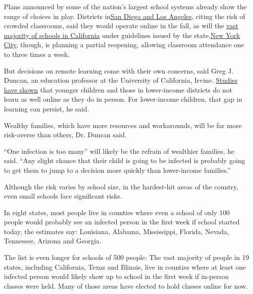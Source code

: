 Plans announced by some of the nation's largest school systems already
show the range of choices in play. Districts
in\href{https://www.nytimes3xbfgragh.onion/2020/07/13/us/lausd-san-diego-school-reopening.html}{}\href{https://www.nytimes3xbfgragh.onion/2020/07/13/us/lausd-san-diego-school-reopening.html}{San
Diego and Los Angeles}, citing the risk of crowded classrooms, said they
would operate online in the fall, as will the
\href{https://www.nytimes3xbfgragh.onion/2020/07/17/us/california-schools-reopening-newsom.html}{vast
majority of schools in California} under guidelines issued by the
state.\href{https://www.nytimes3xbfgragh.onion/2020/07/08/nyregion/nyc-schools-reopening-plan.html}{}\href{https://www.nytimes3xbfgragh.onion/2020/07/08/nyregion/nyc-schools-reopening-plan.html}{New
York City}, though, is planning a partial reopening, allowing classroom
attendance one to three times a week.

But decisions on remote learning come with their own concerns, said Greg
J. Duncan, an education professor at the University of California,
Irvine.
\href{https://www.nytimes3xbfgragh.onion/2020/06/05/us/coronavirus-education-lost-learning.html}{Studies
have shown} that younger children and those in lower-income districts do
not learn as well online as they do in person. For lower-income
children, that gap in learning can persist, he said.

Wealthy families, which have more resources and workarounds, will be far
more risk-averse than others, Dr. Duncan said.

``One infection is too many'' will likely be the refrain of wealthier
families, he said. ``Any slight chance that their child is going to be
infected is probably going to get them to jump to a decision more
quickly than lower-income families.''

Although the risk varies by school size, in the hardest-hit areas of the
country, even small schools face significant risks.

In eight states, most people live in counties where even a school of
only 100 people would probably see an infected person in the first week
if school started today, the estimates say: Louisiana, Alabama,
Mississippi, Florida, Nevada, Tennessee, Arizona and Georgia.

The list is even longer for schools of 500 people: The vast majority of
people in 19 states, including California, Texas and Illinois, live in
counties where at least one infected person would likely show up to
school in the first week if in-person classes were held. Many of those
areas have elected to hold classes online for now.

